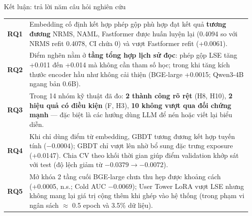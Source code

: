 \documentclass[aspectratio=169,t]{beamer}
\begin{document}
\begin{frame}[shrink]{Kết luận: trả lời năm câu hỏi nghiên cứu}
\scriptsize
\renewcommand{\arraystretch}{1.25}
\begin{tabularx}{\textwidth}{@{}lY@{}}
\toprule
\textbf{RQ1} & Embedding cố định kết hợp phép gộp phù hợp đạt kết quả \textbf{tương đương} NRMS, NAML, Fastformer được huấn luyện lại (0.4094 so với NRMS refit 0.4078, CI chứa 0) và vượt Fastformer refit (+0.0061).\\
\textbf{RQ2} & Điểm nghẽn nằm ở \textbf{tầng tổng hợp lịch sử đọc}: phép gộp LSE tăng +0.011 đến +0.014 mà không cần tham số học; trong khi tăng kích thước encoder hầu như không cải thiện (BGE-large +0.0015; Qwen3-4B ngang bản 0.6B).\\
\textbf{RQ3} & Trong 14 nhóm kỹ thuật đã đo: \textcolor{okc}{\textbf{2 thành công rõ rệt}} (H8, H10), \textcolor{partc}{\textbf{2 hiệu quả có điều kiện}} (F, H3), \textcolor{failc}{\textbf{10 không vượt qua đối chứng mạnh}} — đặc biệt là các hướng dùng LLM để nén hoặc viết lại biểu diễn.\\
\textbf{RQ4} & Khi chỉ dùng điểm từ embedding, GBDT tương đương kết hợp tuyến tính ($-0.0004$); GBDT chỉ vượt lên nhờ bổ sung đặc trưng exposure (+0.0147). Chia CV theo khối thời gian giúp điểm validation khớp sát với test (độ lệch giảm từ $-0.0379 \to -0.0072$).\\
\textbf{RQ5} & Mở khóa 2 tầng cuối BGE-large chưa thu hẹp được khoảng cách (+0.0005, n.s.; Cold AUC $-0.0069$); User Tower LoRA vượt LSE nhưng không mang lại giá trị cộng thêm khi ghép vào hệ thống (trong phạm vi ngân sách $\approx$ 0.5 epoch và 3.5\% dữ liệu).\\
\bottomrule
\end{tabularx}
\par\kern0pt%
\end{frame}
\end{document}
